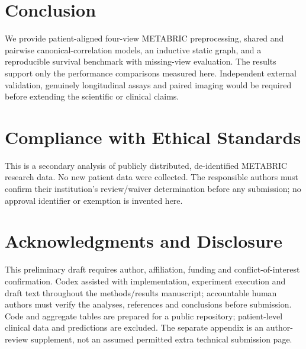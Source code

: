 \documentclass{article}
\begin{document}
\section{Conclusion}
We provide patient-aligned four-view METABRIC preprocessing, shared and
pairwise canonical-correlation models, an inductive static graph, and a
reproducible survival benchmark with missing-view evaluation. The results
support only the performance comparisons measured here. Independent
external validation, genuinely longitudinal assays and paired imaging would
be required before extending the scientific or clinical claims.

\section{Compliance with Ethical Standards}
This is a secondary analysis of publicly distributed, de-identified METABRIC
research data. No new patient data were collected. The responsible authors
must confirm their institution's review/waiver determination before any
submission; no approval identifier or exemption is invented here.

\section{Acknowledgments and Disclosure}
This preliminary draft requires author, affiliation, funding and conflict-of-interest
confirmation. Codex assisted with implementation, experiment execution and
draft text throughout the methods/results manuscript; accountable human
authors must verify the analyses, references and conclusions before submission.
Code and aggregate tables are prepared for a public repository; patient-level
clinical data and predictions are excluded. The separate appendix is an
author-review supplement, not an assumed permitted extra technical submission page.
\end{document}
